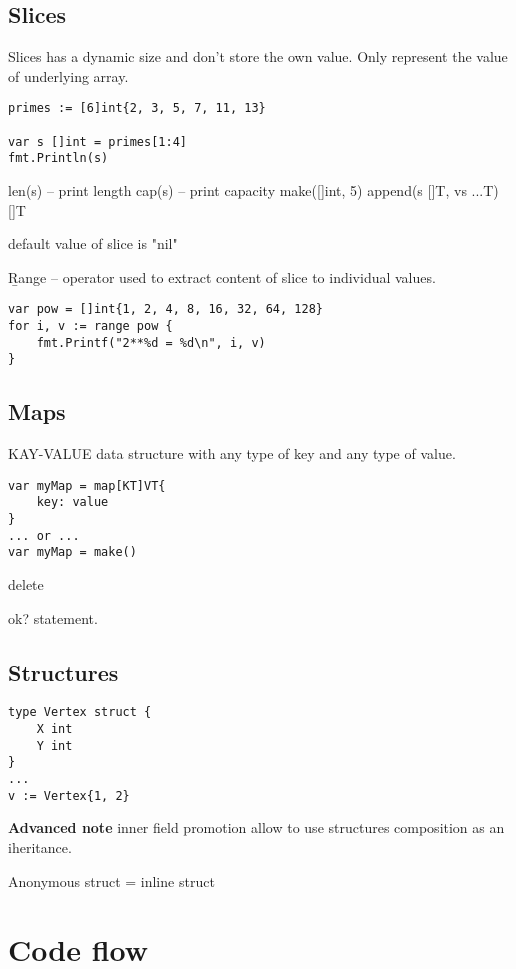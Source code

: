 \documentclass[12pt]{article}
\begin{document}
\subsection{Slices}
Slices has a dynamic size and don't store the own value. Only represent the value of underlying array.
\begin{lstlisting}
primes := [6]int{2, 3, 5, 7, 11, 13}

var s []int = primes[1:4]
fmt.Println(s)
\end{lstlisting}

len(s)  -- print length
cap(s) -- print capacity
make([]int, 5)
append(s []T, vs ...T) []T

default value of slice is "nil"

\b{Range} -- operator used to extract content of slice to individual values.
\begin{lstlisting}
var pow = []int{1, 2, 4, 8, 16, 32, 64, 128}
for i, v := range pow {
    fmt.Printf("2**%d = %d\n", i, v)
}
\end{lstlisting}

\subsection[maps]{Maps}
KAY-VALUE data structure with any type of key and any type of value.
\begin{lstlisting}
var myMap = map[KT]VT{
    key: value
}
... or ...
var myMap = make()
\end{lstlisting}

delete

ok? statement.

\subsection{Structures}

\begin{lstlisting}
type Vertex struct {
    X int
    Y int
}
...
v := Vertex{1, 2}
\end{lstlisting}

\begin{Note} \textbf{Advanced note}
inner field promotion allow to use structures composition as an iheritance.
\end{Note}

Anonymous struct = inline struct

\newpage
\section {Code flow}
\end{document}
